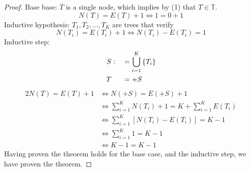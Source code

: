 \documentclass[docid=TP01]{tcom_TP}
\begin{document}
\begin{proof}
Base base: $T$ is a single node, which implies by (1) that $T\in\mathbb{T}$.
\begin{equation*}
N(T)=E(T)+1 \iff 1=0+1
\end{equation*}
Inductive hypothesis: $T_1,T_2,\ldots,T_K$ are trees that verify
\begin{equation*}
N(T_i)=E(T_i)+1 \iff N(T_i)-E(T_i)=1
\end{equation*}
Inductive step:
\begin{alignat*}{2}
S&\vcentcolon&&=\bigcup_{i=1}^{K}{\{T_i\}}\\
T& &&=+S
\end{alignat*}
\begin{alignat*}{2}
N(T)=E(T)+1 &\iff N(+S)                          =E(+S)+1 \\
            &\iff \sum_{i=1}^{K}{N(T_i)}+1       =K+\sum_{i=1}^{K}{E(T_i)} \\
            &\iff \sum_{i=1}^{K}{[N(T_i)-E(T_i)]}=K-1 \\
            &\iff \sum_{i=1}^{K}{1}              =K-1 \\
            &\iff K-1                            =K-1
\end{alignat*}
Having proven the theorem holds for the base case, and the inductive step, we have proven the theorem.
\end{proof}
\pagebreak
\end{document}
